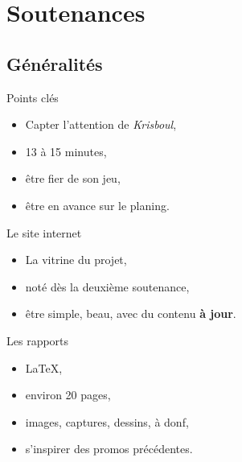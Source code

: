
\section{Soutenances}

\subsection{Généralités}
\begin{frame}
  \begin{block}{Points clés}
    \begin{itemize}
    \item Capter l'attention de \emph{Krisboul},
    \item 13 à 15 minutes,
    \item être fier de son jeu,
    \item être en avance sur le planing.
    \end{itemize}
  \end{block}
\end{frame}

\begin{frame}
  \begin{block}{Le site internet}
    \begin{itemize}
    \item La vitrine du projet,
    \item noté dès la deuxième soutenance,
    \item être simple, beau, avec du contenu \textbf{à jour}.
    \end{itemize}
  \end{block}
\end{frame}

\begin{frame}
  \begin{block}{Les rapports}
    \begin{itemize}
    \item \LaTeX,
    \item environ 20 pages,
    \item images, captures, dessins, à donf,
    \item s'inspirer des promos précédentes.
    \end{itemize}
  \end{block}
\end{frame}